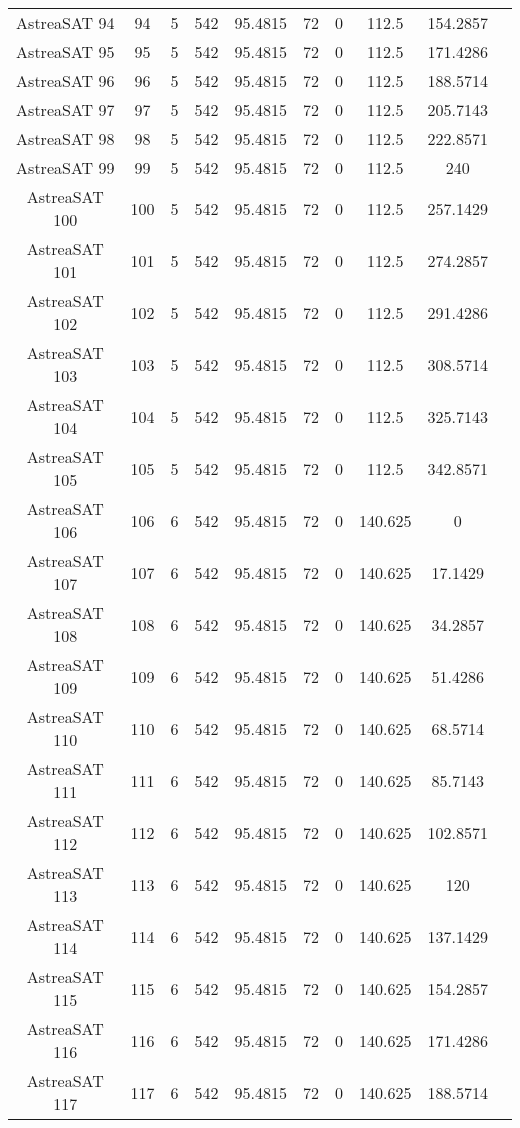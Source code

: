 \begin{longtable}{| c | c | c | c | c | c | c | c | c | c |}
AstreaSAT 94 & 94 & 5 & 542 & 95.4815 & 72 & 0 & 112.5 & 154.2857 \\ 
AstreaSAT 95 & 95 & 5 & 542 & 95.4815 & 72 & 0 & 112.5 & 171.4286 \\ 
AstreaSAT 96 & 96 & 5 & 542 & 95.4815 & 72 & 0 & 112.5 & 188.5714 \\ 
AstreaSAT 97 & 97 & 5 & 542 & 95.4815 & 72 & 0 & 112.5 & 205.7143 \\ 
AstreaSAT 98 & 98 & 5 & 542 & 95.4815 & 72 & 0 & 112.5 & 222.8571 \\ 
AstreaSAT 99 & 99 & 5 & 542 & 95.4815 & 72 & 0 & 112.5 & 240 \\ 
AstreaSAT 100 & 100 & 5 & 542 & 95.4815 & 72 & 0 & 112.5 & 257.1429 \\ 
AstreaSAT 101 & 101 & 5 & 542 & 95.4815 & 72 & 0 & 112.5 & 274.2857 \\ 
AstreaSAT 102 & 102 & 5 & 542 & 95.4815 & 72 & 0 & 112.5 & 291.4286 \\ 
AstreaSAT 103 & 103 & 5 & 542 & 95.4815 & 72 & 0 & 112.5 & 308.5714 \\ 
AstreaSAT 104 & 104 & 5 & 542 & 95.4815 & 72 & 0 & 112.5 & 325.7143 \\ 
AstreaSAT 105 & 105 & 5 & 542 & 95.4815 & 72 & 0 & 112.5 & 342.8571 \\ 
AstreaSAT 106 & 106 & 6 & 542 & 95.4815 & 72 & 0 & 140.625 & 0 \\ 
AstreaSAT 107 & 107 & 6 & 542 & 95.4815 & 72 & 0 & 140.625 & 17.1429 \\ 
AstreaSAT 108 & 108 & 6 & 542 & 95.4815 & 72 & 0 & 140.625 & 34.2857 \\ 
AstreaSAT 109 & 109 & 6 & 542 & 95.4815 & 72 & 0 & 140.625 & 51.4286 \\ 
AstreaSAT 110 & 110 & 6 & 542 & 95.4815 & 72 & 0 & 140.625 & 68.5714 \\ 
AstreaSAT 111 & 111 & 6 & 542 & 95.4815 & 72 & 0 & 140.625 & 85.7143 \\ 
AstreaSAT 112 & 112 & 6 & 542 & 95.4815 & 72 & 0 & 140.625 & 102.8571 \\ 
AstreaSAT 113 & 113 & 6 & 542 & 95.4815 & 72 & 0 & 140.625 & 120 \\ 
AstreaSAT 114 & 114 & 6 & 542 & 95.4815 & 72 & 0 & 140.625 & 137.1429 \\ 
AstreaSAT 115 & 115 & 6 & 542 & 95.4815 & 72 & 0 & 140.625 & 154.2857 \\ 
AstreaSAT 116 & 116 & 6 & 542 & 95.4815 & 72 & 0 & 140.625 & 171.4286 \\ 
AstreaSAT 117 & 117 & 6 & 542 & 95.4815 & 72 & 0 & 140.625 & 188.5714 \\ 

\end{longtable}
